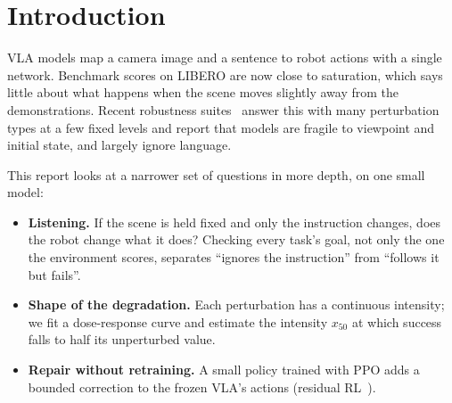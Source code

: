 \begin{abstract}
Vision-language-action (VLA) models are evaluated almost exclusively in the conditions they were
trained on. We probe SmolVLA~\citep{shukor2025smolvla}, a 450M-parameter open VLA, on the LIBERO
benchmark~\citep{liu2023libero} with three questions. \emph{Does it listen?} In LIBERO-Goal, where ten
tasks share one scene, we swap instructions and check all ten goal predicates at every step: the robot
reaches the goal of the instruction it is given in \LangOffInstructed{} of swapped episodes and the
environment's own goal in \LangOffEnv{}, but hand-written paraphrases of the same instruction succeed
far less often (\LangParaPct{} against \LangOrigPct{}), a gap that retrieving the closest training
instruction closes. \emph{How does it break?} Under five graded perturbations, success declines
gradually with camera viewpoint, collapses past sharp thresholds for lighting and pixel noise, and is
halved by an offset of about 3$^\circ$ per arm joint at the start of the episode; combinations of
perturbations that are each harmless make \QDValPooledPct{} of held-out episodes fail, \QDPurePct{} as
pure interactions. \emph{Can a small corrector help?} A residual policy trained with PPO on top of the frozen VLA
improves success on the initial states it was trained on but not on held-out ones, and mostly learns to
finish successful episodes faster. All results come from \TotalEpisodes{} simulated episodes run on a
laptop, with per-episode logs and code released.
\end{abstract}

\section{Introduction}
VLA models map a camera image and a sentence to robot actions with a single network. Benchmark scores
on LIBERO are now close to saturation, which says little about what happens when the scene moves
slightly away from the demonstrations. Recent robustness suites~\citep{fei2025liberoplus,zhou2025liberopro}
answer this with many perturbation types at a few fixed levels and report that models are fragile to
viewpoint and initial state, and largely ignore language.

This report looks at a narrower set of questions in more depth, on one small model:
\begin{itemize}
  \item \textbf{Listening.} If the scene is held fixed and only the instruction changes, does the robot
  change what it does? Checking every task's goal, not only the one the environment scores, separates
  ``ignores the instruction'' from ``follows it but fails''.
  \item \textbf{Shape of the degradation.} Each perturbation has a continuous intensity; we fit a dose-response
  curve and estimate the intensity $x_{50}$ at which success falls to half its unperturbed value.
  \item \textbf{Repair without retraining.} A small policy trained with PPO adds a bounded correction to
  the frozen VLA's actions (residual RL~\citep{silver2018residual,johannink2019residual}).
\end{itemize}


